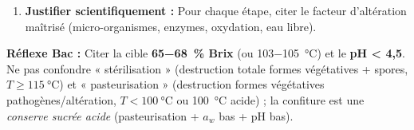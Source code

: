 \documentclass[11pt]{article}
\begin{document}
\begin{methode}
\begin{enumerate}
\begin{itemize}
                \item \textbf{Étiquetage / Stockage :} Lieu frais (\SI{<20}{\celsius}), sec, obscurité. DLUO \SI{12-18}{mois}.
            \end{itemize}
        \item \textbf{Justifier scientifiquement :} Pour chaque étape, citer le facteur d'altération maîtrisé (micro-organismes, enzymes, oxydation, eau libre).
    \end{enumerate}
    \textbf{Réflexe Bac :} Citer la cible \textbf{\SI{65-68}{\%} Brix} (ou \SI{103-105}{\celsius}) et le \textbf{pH < 4,5}. Ne pas confondre « stérilisation » (destruction totale formes végétatives + spores, $T \ge \SI{115}{\celsius}$) et « pasteurisation » (destruction formes végétatives pathogènes/altération, $T < \SI{100}{\celsius}$ ou \SI{100}{\celsius} acide) ; la confiture est une \emph{conserve sucrée acide} (pasteurisation + $a_w$ bas + pH bas).
\end{methode}
\end{document}

